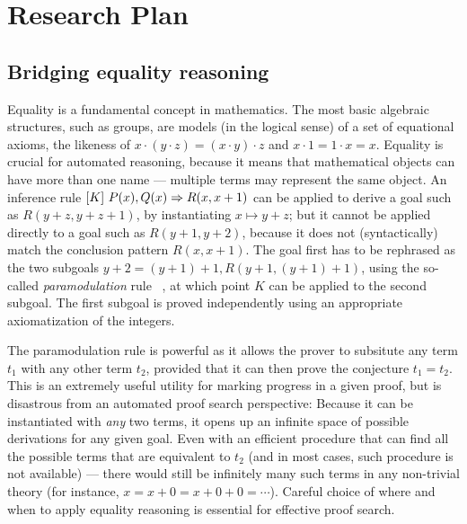 \section{Research Plan }


\subsection{Bridging equality reasoning}

Equality is a fundamental concept in mathematics.
The most basic algebraic structures, such as groups,
are models (in the logical sense) of a set of equational
axioms, the likeness of $x\cdot(y\cdot z) = (x\cdot y)\cdot z$ and $x\cdot 1 = 1\cdot x = x$.
Equality is crucial for automated reasoning, because it means that mathematical objects can have more than one name --- multiple terms may represent the same object.
An inference rule $[K]~{P(x),Q(x)} \Rightarrow {R(x, x+1)}$
can be applied to derive a goal such as $R(y+z, y+z+1)$,
by instantiating $x\mapsto y+z$;
but it cannot be applied directly to a goal such as
$R(y+1, y+2)$, because it does not (syntactically) match the conclusion pattern $R(x,x+1)$.
The goal first has to be rephrased as the two subgoals
$y + 2 = (y + 1) + 1, R(y+1, (y+1)+1)$, using the so-called \emph{paramodulation} rule%
~\cite{Book2001:Nieuwenhuis},
at which point $K$ can be applied to the second subgoal.
The first subgoal is proved independently using an appropriate axiomatization of the integers.

The paramodulation rule is powerful as it allows the prover to subsitute any term $t_1$ with any other term $t_2$, provided that it can then prove the conjecture $t_1 = t_2$.
This is an extremely useful utility for marking progress in a given proof, but is disastrous from an automated proof search perspective:
Because it can be instantiated with \emph{any} two terms, it opens up an infinite space of possible derivations for any given goal.
Even with an efficient procedure that can find all the possible terms that are equivalent to $t_2$ (and in most cases, such procedure is not available) ---
there would still be infinitely many such terms in any non-trivial theory (for instance, $x = x + 0 = x + 0 + 0 = \cdots$).
Careful choice of where and when to apply equality reasoning is essential for effective proof search.

